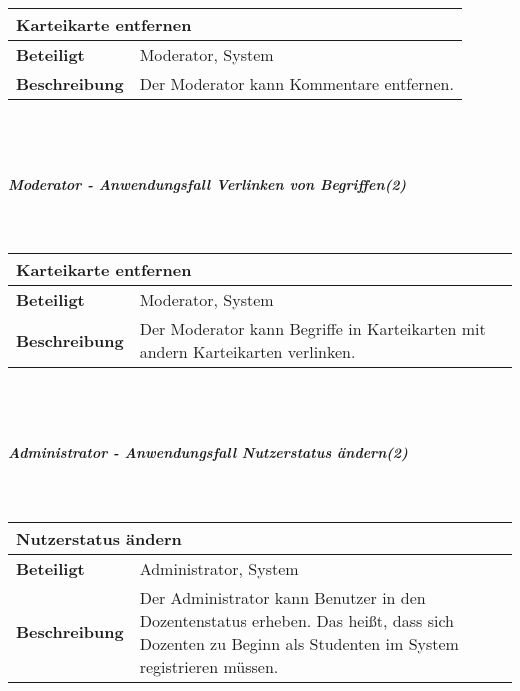 \documentclass[12pt,a4paper]{article}
\begin{document}
\begin{tabular}{l p{10cm}}
\multicolumn{2}{l}{\textbf{Karteikarte entfernen}} \\ \hline
\textbf{Beteiligt} & Moderator, System \\ \hline 
\textbf{Beschreibung} & Der Moderator kann Kommentare entfernen.\\ 
\hline 
\end{tabular}\\\\
\subparagraph{Moderator - Anwendungsfall \glqq Verlinken von Begriffen\grqq (2)}\mbox{}\\

\begin{tabular}{l p{10cm}}
\multicolumn{2}{l}{\textbf{Karteikarte entfernen}} \\ \hline
\textbf{Beteiligt} & Moderator, System \\ \hline 
\textbf{Beschreibung} & Der Moderator kann Begriffe in Karteikarten mit andern Karteikarten verlinken.\\ 
\hline 
\end{tabular}\\\\
\subparagraph{Administrator - Anwendungsfall \glqq Nutzerstatus ändern\grqq (2)}\mbox{}\\

\begin{tabular}{l p{10cm}}
\multicolumn{2}{l}{\textbf{Nutzerstatus ändern}} \\ \hline
\textbf{Beteiligt} & Administrator, System \\ \hline 
\textbf{Beschreibung} & Der Administrator kann Benutzer in den Dozentenstatus erheben. Das heißt, dass sich Dozenten zu Beginn als Studenten im System registrieren müssen.\\ 
\hline 
\end{tabular}\\\\
\end{document}
